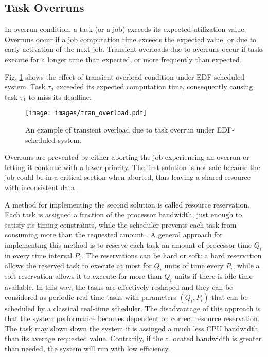 \subsection{Task Overruns}
In overrun condition, a task (or a job) exceeds its expected utilization value.
Overruns occur if a job computation time exceeds the expected value, or due to early activation of the next job.
Transient overloads due to overruns occur if tasks execute for a longer time than expected, or more frequently than expected.

Fig. \ref{transient_EDF} shows the effect of transient overload condition under EDF-scheduled system. Task $\tau_2$ exceeded its expected computation time, consequently causing task $\tau_1$ to miss its deadline.
\begin{figure}[ht]
    \centering
    \texttt{[image: images/tran\_overload.pdf]}
    \caption{An example of transient overload due to task overrun under EDF-scheduled system.}
    \label{transient_EDF}
\end{figure}

Overruns are prevented by either aborting the job experiencing an overrun or letting it continue with a lower priority. 
The first solution is not safe because the job could be in a critical section when aborted, thus leaving a shared resource with inconsistent data 
\cite{buttazzo2011hard}. 

A method for implementing the second solution is called resource reservation.
Each task is assigned a fraction of the processor bandwidth, just enough to satisfy its timing constraints, while the scheduler prevents each task from consuming more than the requested amount \cite{buttazzo2011hard}. 
A general approach for implementing this method is to reserve each task an amount of processor time $Q_i$ in every time interval $P_i$. 
The reservations can be hard or soft: a hard reservation allows the reserved task to execute at most for $Q_i$ units of time every $P_i$, while a soft reservation allows it to execute for more than $Q_i$ units if there is idle time available. 
In this way, the tasks are effectively reshaped and they can be considered as 
periodic real-time tasks with parameters \( (Q_i, P_i) \) that can be scheduled by a classical real-time scheduler.
The disadvantage of this approach is that the system performance becomes dependent on correct resource reservation. The task may slown down the system if is assinged a much less CPU bandwidth than its average requested value. Contrarily, if the allocated bandwidth is greater than needed, the system will run with low efficiency.

